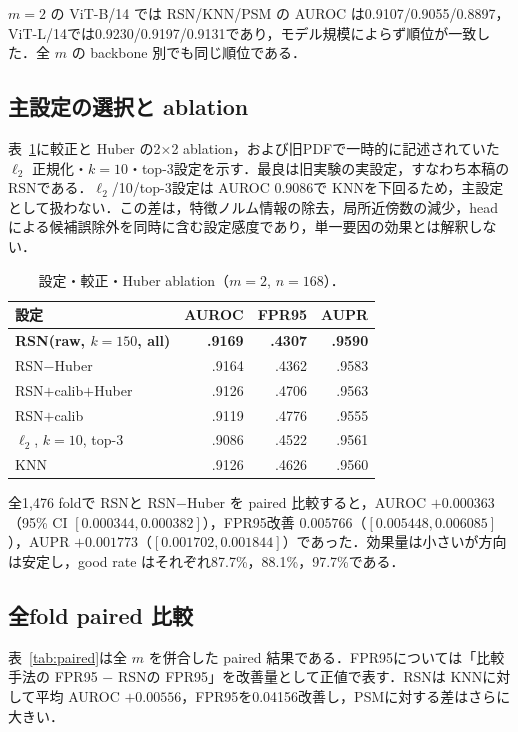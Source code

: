 \documentclass[uplatex,dvipdfmx,a4paper,10pt,twocolumn]{bxjsarticle}
\newcommand{\RSN}{RSN}
\newcommand{\knn}{KNN}
\begin{document}
$m=2$ の ViT-B/14 では \RSN/\knn/PSM の AUROC は0.9107/0.9055/0.8897，ViT-L/14では0.9230/0.9197/0.9131であり，モデル規模によらず順位が一致した．全 $m$ の backbone 別でも同じ順位である．

\subsection{主設定の選択と ablation}

表~\ref{tab:ablation}に較正と Huber の2$\times$2 ablation，および旧PDFで一時的に記述されていた $\ell_2$ 正規化・$k=10$・top-3設定を示す．最良は旧実験の実設定，すなわち本稿の \RSN である．$\ell_2$/10/top-3設定は AUROC 0.9086で \knn を下回るため，主設定として扱わない．この差は，特徴ノルム情報の除去，局所近傍数の減少，head による候補誤除外を同時に含む設定感度であり，単一要因の効果とは解釈しない．

\begin{table}[t]
\centering
\scriptsize
\caption{設定・較正・Huber ablation（$m=2$, $n=168$）．}
\label{tab:ablation}
\begin{tabular}{lrrr}
\toprule
設定 & AUROC & FPR95 & AUPR\\
\midrule
\textbf{\RSN (raw, $k=150$, all)} & \textbf{.9169} & \textbf{.4307} & \textbf{.9590}\\
\RSN$-$Huber & .9164 & .4362 & .9583\\
\RSN$+$calib$+$Huber & .9126 & .4706 & .9563\\
\RSN$+$calib & .9119 & .4776 & .9555\\
$\ell_2$, $k=10$, top-3 & .9086 & .4522 & .9561\\
\knn & .9126 & .4626 & .9560\\
\bottomrule
\end{tabular}
\end{table}

全1,476 foldで \RSN と \RSN$-$Huber を paired 比較すると，AUROC $+0.000363$（95\% CI $[0.000344,0.000382]$），FPR95改善 $0.005766$（$[0.005448,0.006085]$），AUPR $+0.001773$（$[0.001702,0.001844]$）であった．効果量は小さいが方向は安定し，good rate はそれぞれ87.7\%，88.1\%，97.7\%である．

\subsection{全fold paired 比較}

表~\ref{tab:paired}は全 $m$ を併合した paired 結果である．FPR95については「比較手法の FPR95 $-$ \RSN の FPR95」を改善量として正値で表す．\RSN は \knn に対して平均 AUROC $+0.00556$，FPR95を0.04156改善し，PSMに対する差はさらに大きい．
\end{document}
